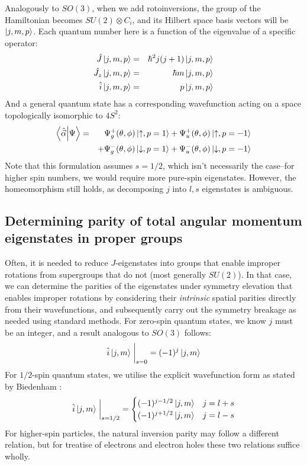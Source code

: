 \documentclass[12pt]{article}
\begin{document}
	Analogously to $SO(3)$, when we add rotoinversions, the group of the Hamiltonian becomes $SU(2)\otimes C_i$, and its Hilbert space basis vectors will be $\ket{j,m,p}$. Each quantum number here is a function of the eigenvalue of a specific operator:
	\begin{eqnarray*}
	\hat{J}\ket{j,m,p}&=&\hbar^2 j(j+1)\ket{j,m,p}\\
	\hat{J_z}\ket{j,m,p}&=&\hbar m\ket{j,m,p}\\
	\hat{i}\ket{j,m,p}&=&p\ket{j,m,p}
	\end{eqnarray*}
	And a general quantum state has a corresponding wavefunction acting on a space topologically isomorphic to $4S^2$:
	\begin{eqnarray*}		
	\braket{\hat{\vec{\alpha}}}{\Psi}&=&\Psi_g^+(\theta,\phi)\ket{\uparrow,p=1}+\Psi_u^+(\theta,\phi)\ket{\uparrow,p=-1}\\
	&&+\Psi_g^-(\theta,\phi)\ket{\downarrow,p=1}+\Psi_u^-(\theta,\phi)\ket{\downarrow,p=-1}
	\end{eqnarray*}
	Note that this formulation assumes $s=1/2$, which isn't necessarily the case--for higher spin numbers, we would require more pure-spin eigenstates. However, the homeomorphism still holds, as decomposing $j$ into $l,s$ eigenstates is ambiguous.
	
	\subsection{Determining parity of total angular momentum eigenstates in proper groups}
	
	Often, it is needed to reduce $J$-eigenstates into groups that enable improper rotations from supergroups that do not (most generally $SU(2)$). In that case, we can determine the parities of the eigenstates under symmetry elevation that enables improper rotations by considering their \textit{intrinsic} spatial parities directly from their wavefunctions, and subsequently carry out the symmetry breakage as needed using standard methods. For zero-spin quantum states, we know $j$ must be an integer, and a result analogous to $SO(3)$ follows:
	$$\hat{i}\ket{j,m}\eval_{s=0}=(-1)^j\ket{j,m}$$
	For $1/2$-spin quantum states, we utilise the explicit wavefunction form as stated by Biedenham \cite[p. 283]{spinor_spherical_harmonics}:
	$$\hat{i}\ket{j,m}\eval_{s=1/2}=
	\begin{cases}
	(-1)^{j-1/2}\ket{j,m} & j = l + s\\
	(-1)^{j+1/2}\ket{j,m} & j = l - s
	\end{cases}$$
	For higher-spin particles, the natural inversion parity may follow a different relation, but for treatise of electrons and electron holes these two relations suffice wholly.
	
\end{document}
